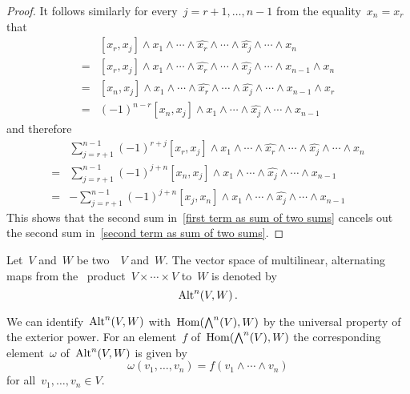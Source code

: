 \begin{proof}
  It follows similarly for every~$j = r+1, \dotsc, n-1$ from the equality~$x_n = x_r$ that
  \begin{align*}
    {}&
    [x_r, x_j] \wedge x_1 \wedge \dotsb \wedge \widehat{x_r} \wedge \dotsb \wedge \widehat{x_j} \wedge \dotsb \wedge x_n
    \\
    ={}&
    [x_r, x_j] \wedge x_1 \wedge \dotsb \wedge \widehat{x_r} \wedge \dotsb \wedge \widehat{x_j} \wedge \dotsb \wedge x_{n-1} \wedge x_n
    \\
    ={}&
    [x_n, x_j] \wedge x_1 \wedge \dotsb \wedge \widehat{x_r} \wedge \dotsb \wedge \widehat{x_j} \wedge \dotsb \wedge x_{n-1} \wedge x_r
    \\
    ={}&
    (-1)^{n-r}
    [x_n, x_j] \wedge x_1 \wedge \dotsb \wedge \widehat{x_j} \wedge \dotsb \wedge x_{n-1}
  \end{align*}
  and therefore
  \begin{align*}
    {}&
    \sum_{j = r+1}^{n-1}
    (-1)^{r+j}
    [x_r, x_j] \wedge x_1 \wedge \dotsb \wedge \widehat{x_r} \wedge \dotsb \wedge \widehat{x_j} \wedge \dotsb \wedge x_n
    \\
    ={}&
    \sum_{j = r+1}^{n-1}
    (-1)^{j+n}
    [x_n, x_j] \wedge x_1 \wedge \dotsb \wedge \widehat{x_j} \wedge \dotsb \wedge x_{n-1}
    \\
    ={}&
    -\sum_{j = r+1}^{n-1}
    (-1)^{j+n}
    [x_j, x_n] \wedge x_1 \wedge \dotsb \wedge \widehat{x_j} \wedge \dotsb \wedge x_{n-1}
  \end{align*}
  This shows that the second sum in~\eqref{first term as sum of two sums} cancels out the second sum in~\eqref{second term as sum of two sums}.
\end{proof}


\begin{definition}
  Let~$V$ and~$W$ be two~\vectorspaces{$\kf$}~$V$ and~$W$.
  The vector space of multilinear, alternating maps from the~ product~$V \times \dotsb \times V$ to~$W$ is denoted by
  \[
    \operatorname{Alt}^n(V,W) \,.
  \]
\end{definition}


\begin{recall}
  \label{expressing alt with exterior powers}
  We can identify~$\operatorname{Alt}^n(V, W)$ with~$\operatorname{Hom}( \operatorname{\bigwedge}^n(V), W)$ by the universal property of the exterior power.
  For an element~$f$ of~$\operatorname{Hom}( \operatorname{\bigwedge}^n(V), W)$ the corresponding element~$\omega$ of~$\operatorname{Alt}^n(V,W)$ is given by
  \[
    \omega(v_1, \dotsc, v_n)
    =
    f( v_1 \wedge \dotsb \wedge v_n )
  \]
  for all~$v_1, \dotsc, v_n \in V$.
\end{recall}


